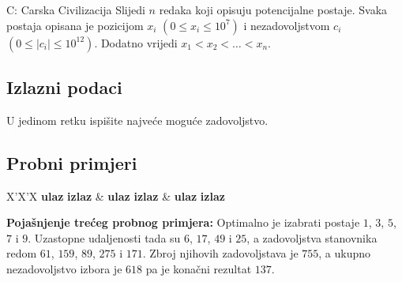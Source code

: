\begin{statement}[
  timelimit=1 s,
  memorylimit=512 MiB,
]{C: Carska Civilizacija}
Slijedi $n$ redaka koji opisuju potencijalne postaje. Svaka postaja opisana je
pozicijom $x_i$ $(0 \le x_i \le 10^7)$ i nezadovoljstvom $c_i$ $(0 \le |c_i|
\le 10^{12})$. Dodatno vrijedi $x_1 < x_2 < \ldots < x_n$.

\subsection*{Izlazni podaci}
U jedinom retku ispišite najveće moguće zadovoljstvo.

\subsection*{Probni primjeri}
\begin{tabularx}{\textwidth}{X'X'X}
  \textbf{ulaz}
  \linespread{1}{}
  \textbf{izlaz}
  \linespread{1}{} &
  \textbf{ulaz}
  \linespread{1}{}
  \textbf{izlaz}
  \linespread{1}{} &
  \textbf{ulaz}
  \linespread{1}{}
  \textbf{izlaz}
  \linespread{1}{}
\end{tabularx}

\textbf{Pojašnjenje trećeg probnog primjera:}
Optimalno je izabrati postaje $1$, $3$, $5$, $7$ i $9$.  Uzastopne udaljenosti
tada su $6$, $17$, $49$ i $25$, a zadovoljstva stanovnika redom $61$, $159$,
$89$, $275$ i $171$.  Zbroj njihovih zadovoljstava je $755$, a ukupno
nezadovoljstvo izbora je $618$ pa je konačni rezultat $137$.

\end{statement}

